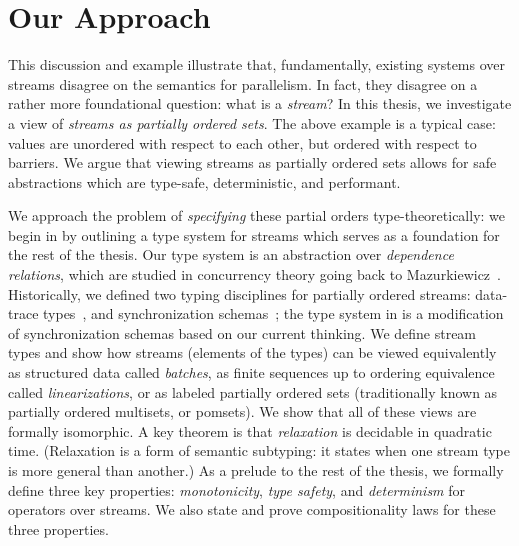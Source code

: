 \section{Our Approach}

This discussion and example illustrate that, fundamentally, existing systems over streams disagree on the semantics for parallelism.
In fact, they disagree on a rather more foundational question: what is a \emph{stream}?
In this thesis, we investigate a view of \emph{streams as partially ordered sets}.
The above example is a typical case: values are unordered with respect to each other, but ordered with respect to barriers.
We argue that viewing streams as partially ordered sets allows for safe abstractions which are type-safe, deterministic, and performant.

We approach the problem of \emph{specifying} these partial orders type-theoretically: we begin in  by
outlining a type system for streams which serves as a foundation for the rest of the thesis.
Our type system is an abstraction over \emph{dependence relations},
which are studied in concurrency theory going back to Mazurkiewicz~\cite{mazurkiewicz1986trace}.
Historically, we defined two typing disciplines for partially ordered streams:
data-trace types~,
and synchronization schemas~;
the type system in  is a modification of synchronization schemas based on our current thinking.
We define stream types and show how streams (elements of the types) can be viewed equivalently as structured data called \emph{batches}, as finite sequences up to ordering equivalence called \emph{linearizations}, or as labeled partially ordered sets (traditionally known as partially ordered multisets, or pomsets).
We show that all of these views are formally isomorphic.
A key theorem is that \emph{relaxation} is decidable in quadratic time.
(Relaxation is a form of semantic subtyping: it states when one stream type is more general than another.)
As a prelude to the rest of the thesis, we formally define three key properties: \emph{monotonicity}, \emph{type safety}, and \emph{determinism} for operators over streams.
We also state and prove compositionality laws for these three properties.

